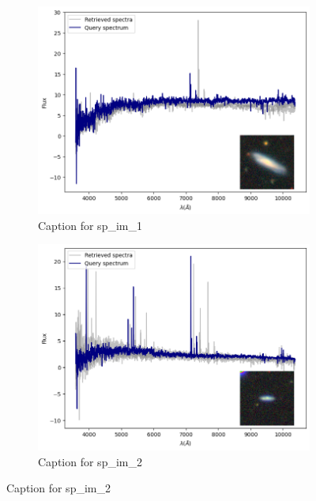 \documentclass[a4paper,12pt]{article}
\begin{document}
\begin{figure}[H]
    \begin{subfigure}[b]{0.45\textwidth}
        \centering
        \includegraphics[width=\textwidth]{../figures/spectral_retrieval_sp_im_1}
        \caption{Caption for sp\_im\_1}
        \label{fig:sp_im_1}
    \end{subfigure}%
    \hfill
    \begin{subfigure}[b]{0.45\textwidth}
        \centering
        \includegraphics[width=\textwidth]{../figures/spectral_retrieval_sp_im_2}
        \caption{Caption for sp\_im\_2}
        \label{fig:sp_im_2}
    \end{subfigure}


\end{figure}
\end{document}
